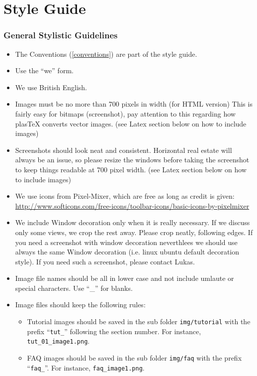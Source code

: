 \section{Style Guide}


\subsubsection{General Stylistic Guidelines}

\begin{itemize}
	\item The Conventions (\ref{conventions}) are part of the style guide.
	\item Use the ``we'' form.
	\item We use British English.
	\item Images must be no more than 700 pixels in width (for HTML version)  This is fairly easy for bitmaps (screenshot), pay attention to this regarding how plasTeX converts vector images. (see Latex section below on how to include images)

    \item Screenshots should look neat and consistent.  Horizontal real estate will always be an issue, so please resize the windows before taking the screenshot to keep things readable at 700 pixel width.  (see Latex section below on how to include images)

	\item We use icons from Pixel-Mixer, which are free as long as credit is given: \url{http://www.softicons.com/free-icons/toolbar-icons/basic-icons-by-pixelmixer}

  \item We include Window decoration only when it is really necessary.  If we discuss only some views, we crop the rest away.  Please crop neatly, following edges. If you need a screenshot with window decoration neverthlees we should use always the same Window decoration (i.e. linux ubuntu default decoration style). If you need such a screenshot, please contact Lukas.
  \item Image file names should be all in lower case and not include umlaute or special characters. Use ``\_'' for blanks.
  \item Image files should keep the following rules:
	\begin{itemize}
		\item Tutorial images should be saved in the sub folder \texttt{img/tutorial} with the prefix ``\texttt{tut\_}'' following the section number. For instance, \texttt{tut\_01\_image1.png}.
		\item FAQ images should be saved in the sub folder \texttt{img/faq} with the prefix ``\texttt{faq\_}''. For instance, \texttt{faq\_image1.png}.
	\end{itemize} 

\end{itemize}

